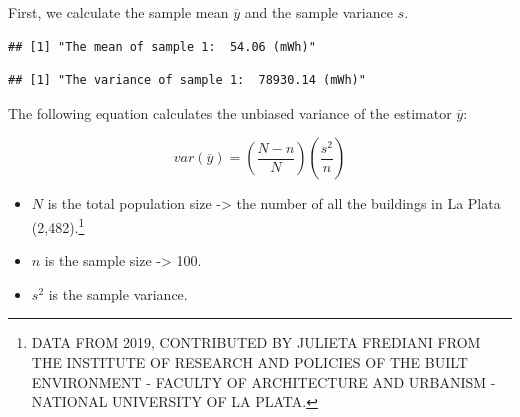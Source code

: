 \documentclass[
]{book}
\newenvironment{Shaded}{\begin{snugshade}}{\end{snugshade}}
\newcommand{\CommentTok}[1]{\textcolor[rgb]{0.56,0.35,0.01}{\textit{#1}}}
\newcommand{\DecValTok}[1]{\textcolor[rgb]{0.00,0.00,0.81}{#1}}
\newcommand{\FunctionTok}[1]{\textcolor[rgb]{0.00,0.00,0.00}{#1}}
\newcommand{\NormalTok}[1]{#1}
\newcommand{\OtherTok}[1]{\textcolor[rgb]{0.56,0.35,0.01}{#1}}
\newcommand{\SpecialCharTok}[1]{\textcolor[rgb]{0.00,0.00,0.00}{#1}}
\newcommand{\StringTok}[1]{\textcolor[rgb]{0.31,0.60,0.02}{#1}}
\providecommand{\tightlist}{%
  \setlength{\itemsep}{0pt}\setlength{\parskip}{0pt}}
\begin{document}
First, we calculate the sample mean \(\overline{y}\) and the sample variance \(s\).

\begin{Shaded}
\end{Shaded}

\begin{verbatim}
## [1] "The mean of sample 1:  54.06 (mWh)"
\end{verbatim}

\begin{Shaded}
\end{Shaded}

\begin{verbatim}
## [1] "The variance of sample 1:  78930.14 (mWh)"
\end{verbatim}

The following equation calculates the unbiased variance of the estimator \(\overline{y}\):

\begin{equation} 
  \hat{var}(\overline{y})= (\frac{N-n}{N})(\frac{s^2}{n}) \label{eq:unvar}
\end{equation}

\begin{itemize}
\tightlist
\item
  \(N\) is the total population size -\textgreater{} the number of all the buildings in La Plata (2,482).\footnote{DATA FROM 2019, CONTRIBUTED BY JULIETA FREDIANI FROM THE INSTITUTE OF RESEARCH AND POLICIES OF THE BUILT ENVIRONMENT - FACULTY OF ARCHITECTURE AND URBANISM - NATIONAL UNIVERSITY OF LA PLATA.}
\item
  \(n\) is the sample size -\textgreater{} 100.
\item
  \(s^2\) is the sample variance.
\end{itemize}
\end{document}
